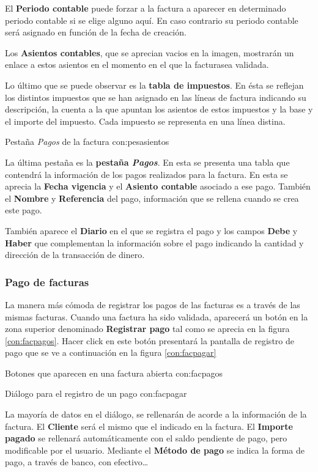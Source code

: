 El \textbf{Periodo contable} puede forzar a la factura a aparecer en determinado periodo contable si se elige alguno aquí. En caso contrario su periodo contable será asignado en función de la fecha de creación.

Los \textbf{Asientos contables}, que se aprecian vacios en la imagen, mostrarán un enlace a estos asientos en el momento en el que la facturasea validada.

Lo último que se puede observar es la \textbf{tabla de impuestos}. En ésta se reflejan los distintos impuestos que se han asignado en las líneas de factura indicando su descripción, la cuenta a la que apuntan los asientos de estos impuestos y la base y el importe del impuesto. Cada impuesto se representa en una línea distina.

{Pestaña \emph{Pagos} de la factura}
{con:pesasientos}

La última pestaña es la \textbf{pestaña \emph{Pagos}}. En esta se presenta una tabla que contendrá la información de los pagos realizados para la factura. En esta se aprecia la \textbf{Fecha vigencia} y el \textbf{Asiento contable} asociado a ese pago. También el \textbf{Nombre} y \textbf{Referencia} del pago, información que se rellena cuando se crea este pago.

También aparece el \textbf{Diario} en el que se registra el pago y los campos \textbf{Debe} y \textbf{Haber} que complementan la información sobre el pago indicando la cantidad y dirección de la transacción de dinero.

\subsubsection{Pago de facturas}

La manera más cómoda de registrar los pagos de las facturas es a través de las mismas facturas. Cuando una factura ha sido validada, aparecerá un botón en la zona superior denominado \textbf{Registrar pago} tal como se aprecia en la figura \ref{con:facpagos}. Hacer click
en este botón presentará la pantalla de registro de pago que se ve a continuación en la figura \ref{con:facpagar}

{Botones que aparecen en una factura abierta}
{con:facpagos}

{Diálogo para el registro de un pago}
{con:facpagar}

La mayoría de datos en el diálogo, se rellenarán de acorde a la información de la factura. El \textbf{Cliente} será el mismo que el indicado en la factura. El \textbf{Importe pagado} se rellenará automáticamente con el saldo pendiente de pago, pero modificable por el usuario. Mediante el \textbf{Método de pago} se indica la forma de pago, a través de banco, con efectivo\ldots

